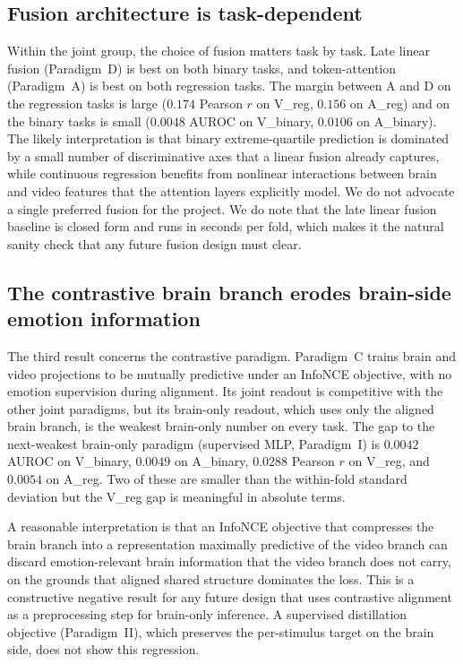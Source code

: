 \documentclass[11pt, a4paper]{article}
\begin{document}
\subsection{Fusion architecture is task-dependent}
Within the joint group, the choice of fusion matters task by task. Late linear fusion
(Paradigm~D) is best on both binary tasks, and token-attention (Paradigm~A) is best on
both regression tasks. The margin between A and D on the regression tasks is large
($0.174$ Pearson $r$ on V\_reg, $0.156$ on A\_reg) and on the binary tasks is small
($0.0048$ AUROC on V\_binary, $0.0106$ on A\_binary). The likely interpretation is that
binary extreme-quartile prediction is dominated by a small number of discriminative axes
that a linear fusion already captures, while continuous regression benefits from
nonlinear interactions between brain and video features that the attention layers
explicitly model. We do not advocate a single preferred fusion for the project. We do
note that the late linear fusion baseline is closed form and runs in seconds per fold,
which makes it the natural sanity check that any future fusion design must clear.

\subsection{The contrastive brain branch erodes brain-side emotion information}
The third result concerns the contrastive paradigm. Paradigm~C trains brain and video
projections to be mutually predictive under an InfoNCE objective, with no emotion
supervision during alignment. Its joint readout is competitive with the other joint
paradigms, but its brain-only readout, which uses only the aligned brain branch, is the
weakest brain-only number on every task. The gap to the next-weakest brain-only paradigm
(supervised MLP, Paradigm~I) is $0.0042$ AUROC on V\_binary, $0.0049$ on A\_binary,
$0.0288$ Pearson $r$ on V\_reg, and $0.0054$ on A\_reg. Two of these are smaller than
the within-fold standard deviation but the V\_reg gap is meaningful in absolute terms.

A reasonable interpretation is that an InfoNCE objective that compresses the brain branch
into a representation maximally predictive of the video branch can discard
emotion-relevant brain information that the video branch does not carry, on the grounds
that aligned shared structure dominates the loss. This is a constructive negative result
for any future design that uses contrastive alignment as a preprocessing step for
brain-only inference. A supervised distillation objective (Paradigm~II), which preserves
the per-stimulus target on the brain side, does not show this regression.
\end{document}
